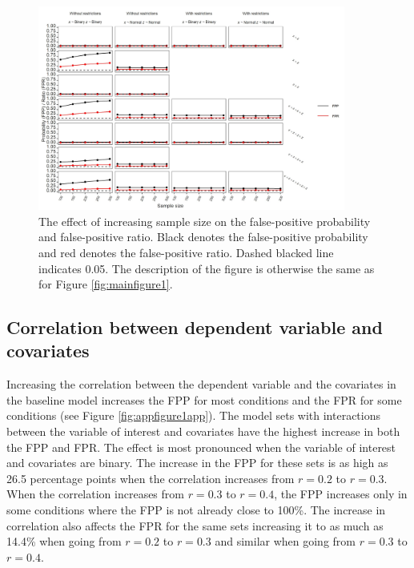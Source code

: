 \begin{figure}[hbt!]
\includegraphics[width=0.9\textwidth]{R/Analysis/Result/Figures/Figure1D.jpeg}
\centering
\caption{The effect of increasing sample size on the false-positive probability and false-positive ratio. Black denotes the false-positive probability and red denotes the false-positive ratio. Dashed blacked line indicates 0.05. The description of the figure is otherwise the same as for Figure \ref{fig:mainfigure1}.}
\label{fig:mainfigure4}
\end{figure}

\subsection{Correlation between dependent variable and covariates}
Increasing the correlation between the dependent variable and the covariates in the baseline model increases the FPP for most conditions and the FPR for some conditions (see Figure \ref{fig:appfigure1app}). The model sets with interactions between the variable of interest and covariates have the highest increase in both the FPP and FPR. The effect is most pronounced when the variable of interest and covariates are binary. The increase in the FPP for these sets is as high as 26.5 percentage points when the correlation increases from $r=0.2$ to $r=0.3$. When the correlation increases from $r=0.3$ to $r=0.4$, the FPP increases only in some conditions where the FPP is not already close to 100\%. The increase in correlation also affects the FPR for the same sets increasing it to as much as 14.4\% when going from $r=0.2$ to $r=0.3$ and similar when going from $r=0.3$ to $r=0.4$. 